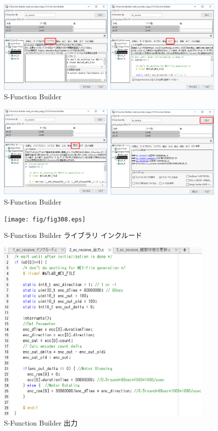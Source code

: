 \begin{figure}[htbp]
    \centering
    \includegraphics[width=380pt]{fig/fig306.eps}
    \caption{S-Function Builder}
    \label{fig306}
\end{figure}

\begin{figure}[htbp]
    \centering
    \includegraphics[width=380pt]{fig/fig307.eps}
    \caption{S-Function Builder}
    \label{fig307}
\end{figure}   

\begin{figure}[htbp]
    \centering
    \texttt{[image: fig/fig308.eps]}
    \caption{S-Function Builder ライブラリ インクルード}
    \label{fig308}
\end{figure}   

\begin{figure}[htbp]
    \centering
    \includegraphics[width=300pt]{fig/fig309.eps}
    \caption{S-Function Builder 出力}
    \label{fig309}
\end{figure}  

